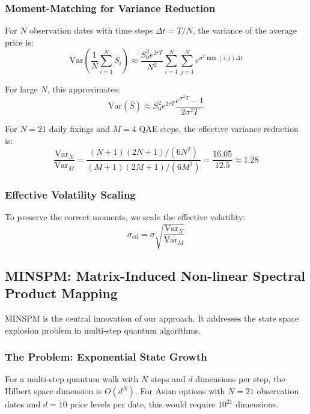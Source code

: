 \documentclass[12pt]{article}
\begin{document}
\subsubsection{Moment-Matching for Variance Reduction}

For $N$ observation dates with time steps $\Delta t = T/N$, the variance of the average price is:
\begin{equation}
    \text{Var}\left(\frac{1}{N} \sum_{i=1}^{N} S_i\right) \approx \frac{S_0^2 e^{2rT}}{N^2} \sum_{i=1}^{N} \sum_{j=1}^{N} e^{\sigma^2 \min(i,j) \Delta t}
\end{equation}

For large $N$, this approximates:
\begin{equation}
    \text{Var}(\bar{S}) \approx S_0^2 e^{2rT} \frac{e^{\sigma^2 T} - 1}{2\sigma^2 T}
\end{equation}

For $N=21$ daily fixings and $M=4$ QAE steps, the effective variance reduction is:
\begin{equation}
    \frac{\text{Var}_N}{\text{Var}_M} = \frac{(N+1)(2N+1)/(6N^2)}{(M+1)(2M+1)/(6M^2)} = \frac{16.05}{12.5} \approx 1.28
\end{equation}

\subsubsection{Effective Volatility Scaling}

To preserve the correct moments, we scale the effective volatility:
\begin{equation}
    \sigma_{\text{eff}} = \sigma \sqrt{\frac{\text{Var}_N}{\text{Var}_M}}
\end{equation}

\subsection{MINSPM: Matrix-Induced Non-linear Spectral Product Mapping}

MINSPM is the central innovation of our approach. It addresses the state space explosion problem in multi-step quantum algorithms.

\subsubsection{The Problem: Exponential State Growth}

For a multi-step quantum walk with $N$ steps and $d$ dimensions per step, the Hilbert space dimension is $O(d^N)$. For Asian options with $N=21$ observation dates and $d=10$ price levels per date, this would require $10^{21}$ dimensions.
\end{document}
